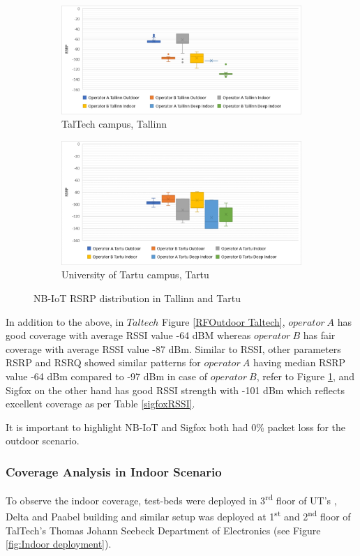 \documentclass[12pt]{article}
\begin{document}
 \begin{figure}[h!]
\begin{subfigure}[t]{\linewidth}
  \centering
  \includegraphics[width=.5\linewidth]{Images/tallinn/TallinnRSRPboxplot.pdf}  
  \caption{TalTech campus, Tallinn}
\end{subfigure}
\begin{subfigure}[t]{\linewidth}
  \centering
  \includegraphics[width=.5\linewidth]{Images/tartu/TartuRSRPboxplot.pdf}  
  \caption{University of Tartu campus, Tartu}
  
\end{subfigure}
\caption{NB-IoT RSRP distribution in Tallinn and Tartu}
 \label{boxplot}
\end{figure}






In addition to the above, in $Taltech$ Figure \ref{RFOutdoor Taltech}, $operator\ A$ has good coverage with average RSSI value -64 dBM whereas $operator\ B$ has fair coverage with average RSSI value -87 dBm. Similar to RSSI, other parameters RSRP and RSRQ showed similar patterns for $operator\ A$ having median RSRP value -64 dBm compared to -97 dBm in case of $operator\ B$, refer to Figure \ref{boxplot}, and Sigfox on the other hand has good RSSI strength with -101 dBm which reflects excellent coverage as per Table \ref{sigfoxRSSI}.\par
It is important to highlight NB-IoT and Sigfox both had 0\% packet loss for the outdoor scenario.




\subsubsection{Coverage Analysis in Indoor Scenario}\label{indoor analysis}
To observe the indoor coverage, test-beds were deployed in 3\textsuperscript{rd} floor of UT's , Delta and Paabel building and similar setup was deployed at 1\textsuperscript{st} and 2\textsuperscript{nd} floor of TalTech's Thomas Johann Seebeck Department of Electronics (see Figure \ref{fig:Indoor deployment}).
\end{document}
